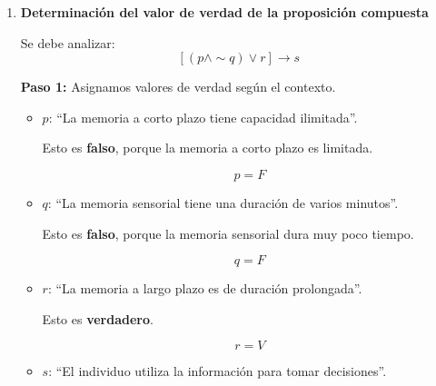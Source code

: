 \documentclass[12pt]{article}
\begin{document}
\begin{enumerate}
\begin{enumerate}[label=\alph*)]
		\begin{quote}
			\textbf{Si la memoria a corto plazo tiene capacidad ilimitada, entonces la memoria sensorial tiene una duración de varios minutos, y si la memoria a largo plazo no es de duración prolongada, entonces el individuo utiliza la información para tomar decisiones.}
		\end{quote}
		
		\textbf{Respuesta final:}
		\[
		(p \to q)\land (\sim r \to s)
		\]
		se traduce como:
		
		\begin{quote}
			Si la memoria a corto plazo tiene capacidad ilimitada, entonces la memoria sensorial tiene una duración de varios minutos, y si la memoria a largo plazo no es de duración prolongada, entonces el individuo utiliza la información para tomar decisiones.
		\end{quote}
		
		\vspace{0.4cm}
		
		\item \textbf{Determinación del valor de verdad de la proposición compuesta}
		
		Se debe analizar:
		\[
		[(p\land \sim q)\lor r]\to s
		\]
		
		\textbf{Paso 1:} Asignamos valores de verdad según el contexto.
		
		\begin{itemize}
			\item \(p\): ``La memoria a corto plazo tiene capacidad ilimitada''.
			
			Esto es \textbf{falso}, porque la memoria a corto plazo es limitada.
			
			\[
			p=F
			\]
			
			\item \(q\): ``La memoria sensorial tiene una duración de varios minutos''.
			
			Esto es \textbf{falso}, porque la memoria sensorial dura muy poco tiempo.
			
			\[
			q=F
			\]
			
			\item \(r\): ``La memoria a largo plazo es de duración prolongada''.
			
			Esto es \textbf{verdadero}.
			
			\[
			r=V
			\]
			
			\item \(s\): ``El individuo utiliza la información para tomar decisiones''.
			

\end{itemize}
\end{enumerate}
\end{enumerate}
\end{document}
